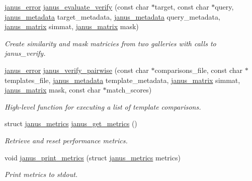 \begin{DoxyCompactItemize}
\hyperlink{group__janus_ga1b275e4dade484951b366f785597b8f6}{janus\+\_\+error} \hyperlink{group__janus__io_gaa0efe4b3c2feea34c685db1fcea6e9f9}{janus\+\_\+evaluate\+\_\+verify} (const char $\ast$target, const char $\ast$query, \hyperlink{group__janus__io_gaeddd0e276eebe8616d41808eed8dff16}{janus\+\_\+metadata} target\+\_\+metadata, \hyperlink{group__janus__io_gaeddd0e276eebe8616d41808eed8dff16}{janus\+\_\+metadata} query\+\_\+metadata, \hyperlink{group__janus__io_ga3d3454709ac3ce27a99d42444408f16d}{janus\+\_\+matrix} simmat, \hyperlink{group__janus__io_ga3d3454709ac3ce27a99d42444408f16d}{janus\+\_\+matrix} mask)
\begin{DoxyCompactList}\small\item\em Create similarity and mask matricies from two galleries with calls to janus\+\_\+verify. \end{DoxyCompactList}\item 
\hyperlink{group__janus_ga1b275e4dade484951b366f785597b8f6}{janus\+\_\+error} \hyperlink{group__janus__io_gaa7eb8df4fa2fe3f901280b2095c1c9df}{janus\+\_\+verify\+\_\+pairwise} (const char $\ast$comparisons\+\_\+file, const char $\ast$templates\+\_\+file, \hyperlink{group__janus__io_gaeddd0e276eebe8616d41808eed8dff16}{janus\+\_\+metadata} template\+\_\+metadata, \hyperlink{group__janus__io_ga3d3454709ac3ce27a99d42444408f16d}{janus\+\_\+matrix} simmat, \hyperlink{group__janus__io_ga3d3454709ac3ce27a99d42444408f16d}{janus\+\_\+matrix} mask, const char $\ast$match\+\_\+scores)
\begin{DoxyCompactList}\small\item\em High-\/level function for executing a list of template comparisons. \end{DoxyCompactList}\item 
struct \hyperlink{structjanus__metrics}{janus\+\_\+metrics} \hyperlink{group__janus__io_gace8f8eb72e7f7bcb23ff0a6e0452a4be}{janus\+\_\+get\+\_\+metrics} ()
\begin{DoxyCompactList}\small\item\em Retrieve and reset performance metrics. \end{DoxyCompactList}\item 
void \hyperlink{group__janus__io_ga91b1da5d5a1d4871146e1e10a3fb8678}{janus\+\_\+print\+\_\+metrics} (struct \hyperlink{structjanus__metrics}{janus\+\_\+metrics} metrics)
\begin{DoxyCompactList}\small\item\em Print metrics to stdout. \end{DoxyCompactList}\end{DoxyCompactItemize}


